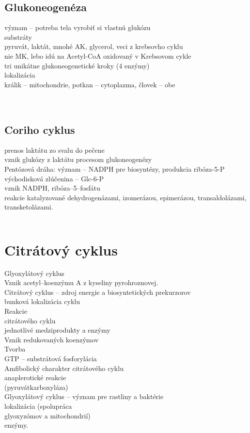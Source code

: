 \subsection{Glukoneogenéza}
význam -- potreba tela vyrobiť si vlastnú glukózu\\
substráty\\
\tab pyruvát, laktát, mnohé AK, glycerol, veci z krebsovho cyklu\\
\tab nie MK, lebo idú na Acetyl-CoA oxidovaný v Krebsovom cykle\\
tri unikátne glukoneogenetické kroky (4 enzýmy)\\
lokalizácia\\
\tab králik -- mitochondrie, potkan -- cytoplazma, človek -- obe\\
\\
\\
\subsection{Coriho cyklus}
prenos laktátu zo svalu do pečene\\
vznik glukózy z laktátu procesom glukoneogenézy\\
Pentózová dráha: 
\tab význam -- NADPH pre biosyntézy, produkcia ribóza-5-P\\
\tab východisková zlúčenina -- Glc-6-P\\
\tab vznik NADPH, ribóza--5--fosfátu\\
\tab reakcie katalyzované dehydrogenázami, izomerázou, epimerázou, transaldolázami, transketolázami.\\
\\
\section{Citrátový cyklus}
Glyoxylátový cyklus\\
Vznik acetyl--koenzýmu A z kyseliny pyrohroznovej.\\
Citrátový cyklus -- zdroj energie a biosyntetických prekurzorov\\
\tab bunková lokalizácia cyklu\\
Reakcie\\
citrátového cyklu\\
\tab jednotlivé medziprodukty a enzýmy\\
Vznik redukovaných koenzýmov\\
Tvorba\\
GTP -- substrátová fosforylácia\\
Amfibolický charakter citrátového cyklu\\
\tab anaplerotické reakcie\\
(pyruvátkarboxyláza)\\
Glyoxylátový cyklus -- význam pre rastliny a baktérie\\
\tab lokalizácia (spolupráca\\
glyoxyzómov a mitochondrií)\\
\tab enzýmy.\\
\\
